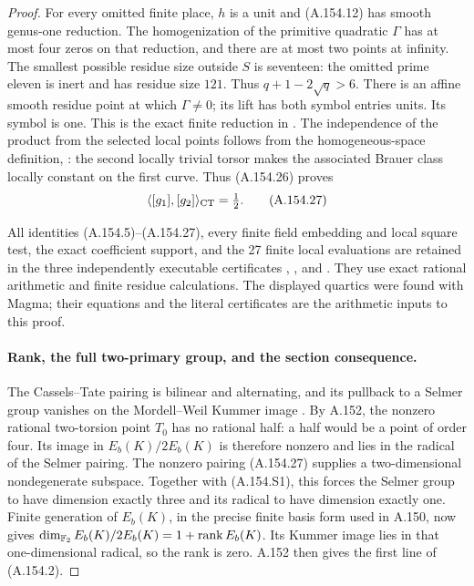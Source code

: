 \begin{proof}
For every omitted finite place, \(h\) is a unit and
(A.154.12) has smooth genus-one reduction.  The
homogenization of the primitive quadratic \(\Gamma\)
has at most four zeros on that reduction, and there
are at most two points at infinity.  The smallest
possible residue size outside \(S\) is seventeen:
the omitted prime eleven is inert and has residue
size \(121\).  Thus \(q+1-2\sqrt q>6\).
There is an affine smooth residue point at which
\(\Gamma\ne0\); its lift has both symbol entries
units.  Its symbol is one.
This is the exact finite reduction in
\cite[Remark 3.3]{AgentFisherBinaryQuartics2022}.
The independence of the product from the selected local
points follows from the homogeneous-space definition,
\cite[Section 4, equation (10)]{AgentFisherBinaryQuartics2022}:
the second locally trivial torsor makes the associated
Brauer class locally constant on the first curve.
Thus (A.154.26) proves
\[
                \langle[g_1],[g_2]\rangle_{\rm CT}=\tfrac12.
\tag{A.154.27}
\]

All identities (A.154.5)--(A.154.27), every finite field
embedding and local square test, the exact coefficient
support, and the 27 finite local evaluations are retained
in the three independently executable certificates
,
, and
.
They use exact rational arithmetic and finite residue
calculations.  The displayed quartics were found with
Magma; their equations and the literal certificates are
the arithmetic inputs to this proof.

\paragraph{Rank, the full two-primary group, and the section consequence.}
The Cassels--Tate pairing is bilinear and alternating,
and its pullback to a Selmer group vanishes on the
Mordell--Weil Kummer image
\cite[Introduction, Remark 3.2(v), and Section 4]
{AgentFisherBinaryQuartics2022}.
By A.152, the nonzero rational two-torsion point \(T_0\)
has no rational half: a half would be a point of order
four.  Its image in \(E_b(K)/2E_b(K)\) is therefore
nonzero and lies in the radical of the Selmer pairing.
The nonzero pairing (A.154.27) supplies a two-dimensional
nondegenerate subspace.  Together with (A.154.S1), this
forces the Selmer group to have dimension exactly three
and its radical to have dimension exactly one.
Finite generation of \(E_b(K)\), in the precise finite
basis form used in A.150, now gives
\(\dim_{\mathbb F_2}E_b(K)/2E_b(K)=1+\operatorname{rank}E_b(K)\).
Its Kummer image lies in that one-dimensional radical,
so the rank is zero.  A.152 then gives the first line
of (A.154.2).


\end{proof}
